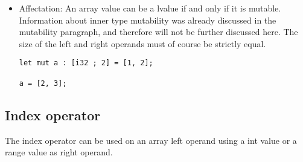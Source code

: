 \begin{itemize}
\item Affectation: An array value can be a lvalue if and only if it is mutable.
  Information about inner type mutability was already discussed in the
  mutability paragraph, and therefore will not be further discussed here. The
  size of the left and right operands must of course be strictly equal.

  \begin{lstlisting}[style=coloredverbatim]
let mut a : [i32 ; 2] = [1, 2];

a = [2, 3];
  \end{lstlisting}

\end{itemize}

\subsection {Index operator}

The index operator can be used on an array left operand using a int value or a
range value as right operand.

